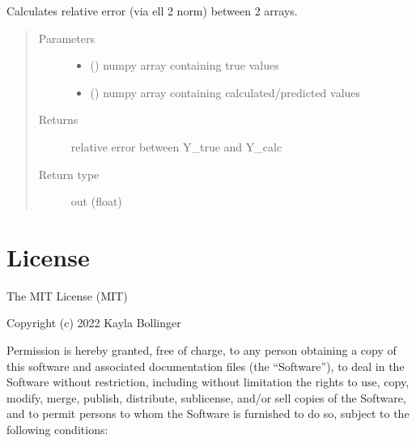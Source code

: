 \documentclass[letterpaper,10pt,english]{sphinxmanual}
\begin{document}

\begin{fulllineitems}
\label{\detokenize{rom:rom.utils.rel_error}}
\sphinxAtStartPar
Calculates relative error (via ell 2 norm) between 2 arrays.
\begin{quote}\begin{description}
\item[{Parameters}] \leavevmode\begin{itemize}
\item {} 
\sphinxAtStartPar
{} () \textendash{} numpy array containing true values

\item {} 
\sphinxAtStartPar
{} () \textendash{} numpy array containing calculated/predicted values

\end{itemize}

\item[{Returns}] \leavevmode
\sphinxAtStartPar
relative error between Y\_true and Y\_calc

\item[{Return type}] \leavevmode
\sphinxAtStartPar
out (float)

\end{description}\end{quote}

\end{fulllineitems}



\chapter{License}
\label{\detokenize{license:license}}\label{\detokenize{license::doc}}
\sphinxAtStartPar
The MIT License (MIT)

\sphinxAtStartPar
Copyright (c) 2022 Kayla Bollinger

\sphinxAtStartPar
Permission is hereby granted, free of charge, to any person obtaining a copy
of this software and associated documentation files (the “Software”), to deal
in the Software without restriction, including without limitation the rights
to use, copy, modify, merge, publish, distribute, sublicense, and/or sell
copies of the Software, and to permit persons to whom the Software is
furnished to do so, subject to the following conditions:
\end{document}
